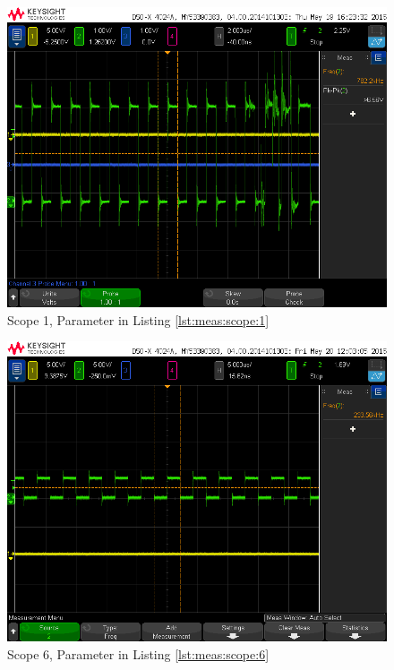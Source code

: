 \begin{figure}[h!tb]
    \centering
    \includegraphics[width=1\textwidth, trim=0mm 21mm 0mm 11mm, clip]{images/scopeShots/scope_1.png}
    \caption{Scope 1, Parameter in Listing \ref{lst:meas:scope:1}}
    \label{fig:meas:scope:1}
\end{figure}

\begin{figure}[h!tb]
    \centering
    \includegraphics[width=1\textwidth, trim=0mm 21mm 0mm 11mm, clip]{images/scopeShots/scope_6.png}
    \caption{Scope 6, Parameter in Listing \ref{lst:meas:scope:6}}
    \label{fig:meas:scope:6}
\end{figure}

